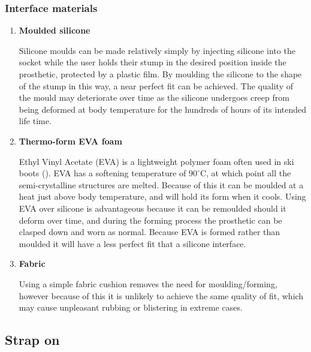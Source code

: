 \documentclass[11pt,3p]{report}
\begin{document}
\begin{multicols}{2}
\pagebreak

	\subsubsection{Interface materials}		

		\begin{enumerate}[noitemsep]
		\item \textbf{Moulded silicone} {
		
		Silicone moulds can be made relatively simply by injecting silicone into the socket while the user holds their stump in the desired position inside the prosthetic, protected by a plastic film. By moulding the silicone to the shape of the stump in this way, a near perfect fit can be achieved. The quality of the mould may deteriorate over time as the silicone undergoes creep from being deformed at body temperature for the hundreds of hours of its intended life time. 
		}
		
		\item \textbf{Thermo-form EVA foam} {
		 
		Ethyl Vinyl Acetate (EVA) is a lightweight polymer foam often used in ski boots (\cite{ski}). EVA has a softening temperature of $90^{\circ}$C, at which point all the semi-crystalline structures are melted. Because of this it can be moulded at a heat just above body temperature, and will hold its form when it cools. Using EVA over silicone is advantageous because it can be remoulded should it deform over time, and during the forming process the prosthetic can be clasped down and worn as normal. Because EVA is formed rather than moulded it will have a less perfect fit that a silicone interface.
		}
		
		\item \textbf{Fabric} {
		
		Using a simple fabric cushion removes the need for moulding/forming, however because of this it is unlikely to achieve the same quality of fit, which may cause unpleasant rubbing or blistering in extreme cases.	
		}
		\end{enumerate}
							\vfill\null
			\columnbreak
		\subsection{Strap on}
		

\end{multicols}
\end{document}
